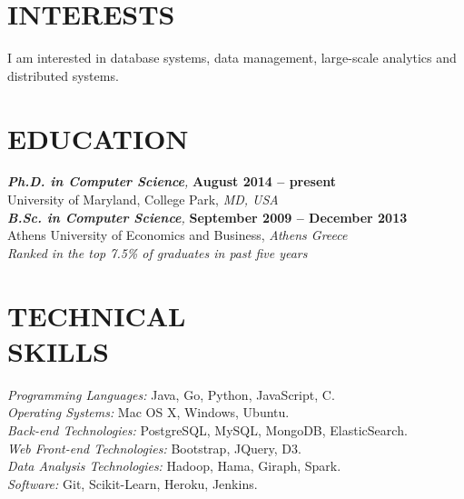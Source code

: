\documentclass[margin, 10pt]{res} %
\begin{document}
\begin{resume}


\section{INTERESTS}

I am interested in database systems, data management, large-scale analytics and distributed systems.


\section{EDUCATION}

{\sl \textbf{Ph.D. in Computer Science},}  \hfill \textbf{August 2014 -- present} \\
University of Maryland, College Park,  \textit{MD, USA}\\

{\sl \textbf{B.Sc. in Computer Science},}  \hfill \textbf{September 2009 -- December 2013} \\
Athens University of Economics and Business, \textit{Athens Greece}\\
\textit{Ranked in the top 7.5\% of graduates in past five years}\\


\section{TECHNICAL \\ SKILLS}

{\sl Programming Languages:} Java, Go, Python, JavaScript, C. \\
{\sl Operating Systems:} Mac OS X, Windows, Ubuntu.\\
{\sl Back-end Technologies:} PostgreSQL, MySQL, MongoDB, ElasticSearch. \\
{\sl Web Front-end Technologies:} Bootstrap, JQuery, D3. \\
{\sl Data Analysis Technologies:} Hadoop, Hama, Giraph, Spark.\\
{\sl Software:} Git, Scikit-Learn, Heroku, Jenkins. \\





\end{resume}
\end{document}
